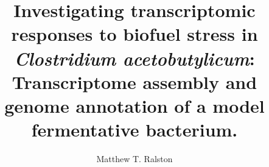 % 
%

\title[Investigating transcriptomic responses to biofuel stress in Clostridium Aceotbutylicum : Transcriptome assembly and genome annotation of a model fermentative bacterium.]{Investigating transcriptomic responses to biofuel stress in \textit{Clostridium acetobutylicum}:\\ Transcriptome assembly and genome annotation of a model fermentative bacterium.}
\author{Matthew T. Ralston}
\majorfieldtrue{}
\subject{Master of Science in Bioinformatics and Computational Biology}

\maketitlepage %

\begin{approvalpage}
\end{approvalpage}

\begin{front} %







\maketocloflot




\end{front}

